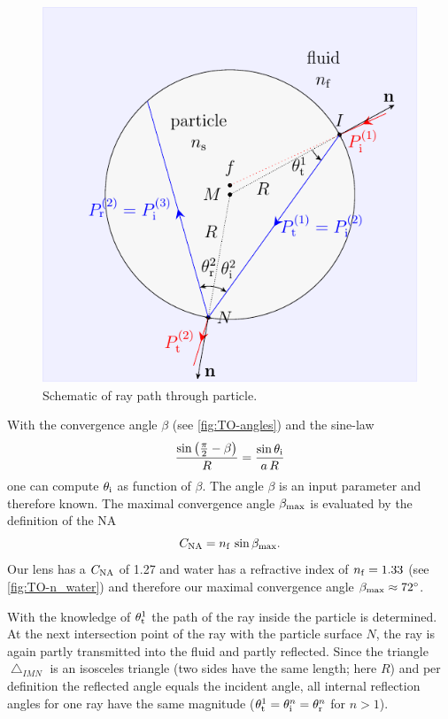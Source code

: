 \begin{figure}[thp]
  \centering
  \includegraphics[]{Plots/cache/ray.pdf}
  \caption{Schematic of ray path through particle.}
  \label{fig:TO-ray_particle}
\end{figure}

With the convergence angle $\beta$ (see \cref{fig:TO-angles}) and the sine-law
\begin{equation}
  \frac{\sin\left( \frac{\pi}{2}-\beta \right)}{R} = 
  \frac{\sin\theta_{\mathrm{i}}}{a\,R}
  \label{eq:TO-sine-law}
\end{equation}
one can compute $\theta_{\mathrm{i}}$ as function of $\beta$. The angle $\beta$ is an 
input parameter and therefore known. The maximal convergence angle 
$\beta_{\mathrm{max}}$ is evaluated by the definition of the NA
\begin{equation}
  C_{\mathrm{NA}} = n_{\mathrm{f}}\,\sin\beta_{\mathrm{max}}.
  \label{eq:TO-NA}
\end{equation}
Our lens has a $C_{\mathrm{NA}}$ of 1.27 and water has a refractive index of $n_{\mathrm{f}}=1.33$ 
(see \cref{fig:TO-n_water}) and therefore our maximal convergence angle 
$\beta_{\mathrm{max}} \approx \SI{72}{\degree}$.

With the knowledge of $\theta_{\mathrm{t}}^{1}$ the path of the ray inside the 
particle is determined. At the next intersection point of the ray with the 
particle surface $N$, the ray is again partly transmitted into the fluid and 
partly reflected. Since the triangle $\bigtriangleup_{IMN}$ is an isosceles 
triangle (two sides have the same length; here $R$) and per definition the 
reflected angle equals the incident angle, all internal reflection angles for 
one ray have the same magnitude 
($\theta_{\mathrm{t}}^{1}=\theta_{\mathrm{i}}^{n}=\theta_{\mathrm{r}}^{n}$ for $n>1$).

